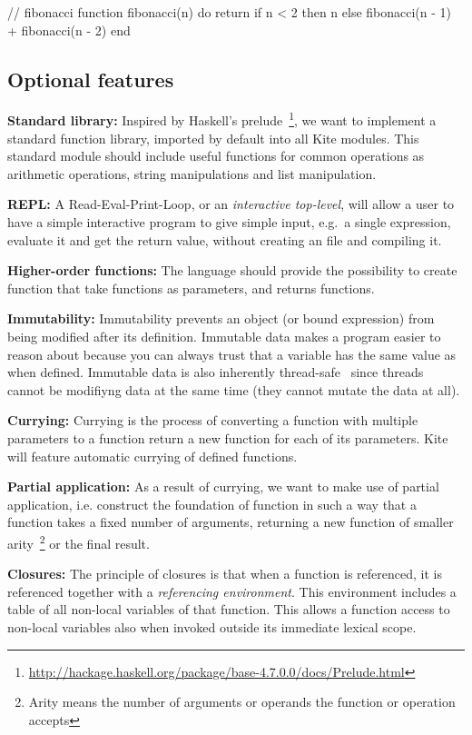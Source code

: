 \begin{pseudo}
// fibonacci
function fibonacci(n) do
  return if n < 2
    then n
    else fibonacci(n - 1) + fibonacci(n - 2)
end
\end{pseudo}


\subsection{Optional features}

\textbf{Standard library:}
Inspired by Haskell's prelude~\footnote{\url{http://hackage.haskell.org/package/base-4.7.0.0/docs/Prelude.html}}, we want to implement a standard function library, imported by default into all Kite modules. This standard module should include useful functions for common operations as arithmetic operations, string manipulations and list manipulation.

\textbf{REPL:}
A Read-Eval-Print-Loop, or an \emph{interactive top-level}, will allow a user to have a simple interactive program to give simple input, e.g.\ a single expression, evaluate it and get the return value, without creating an file and compiling it.

\textbf{Higher-order functions:}
The language should provide the possibility to create function that take functions as parameters, and returns functions.

\textbf{Immutability:}
Immutability prevents an object (or bound expression) from being modified after its definition. Immutable data makes a program easier to reason about because you can always trust that a variable has the same value as when defined. Immutable data is also inherently thread-safe~\cite[sec. 3.4]{goetz06} since threads cannot be modifiyng data at the same time (they cannot mutate the data at all).

\textbf{Currying:}
Currying is the process of converting a function with multiple parameters to a function return a new function for each of its parameters. Kite will feature automatic currying of defined functions.

\textbf{Partial application:}
As a result of currying, we want to make use of partial application, i.e. construct the foundation of function in such a way that a function takes a fixed number of arguments, returning a new function of smaller arity~\footnote{Arity means the number of arguments or operands the function or operation accepts} or the final result.

\textbf{Closures:}
The principle of closures is that when a function is referenced, it is referenced together with a \emph{referencing environment}. This environment includes a table of all non-local variables of that function. This allows a function access to non-local  variables also when invoked outside its immediate lexical scope.

